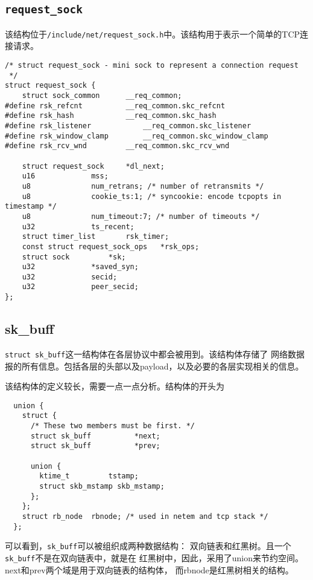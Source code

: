 	\subsection{\texttt{request_sock}}

		该结构位于\texttt{/include/net/request_sock.h}中。该结构用于表示一个简单的TCP连接请求。

\begin{verbatim}
/* struct request_sock - mini sock to represent a connection request
 */
struct request_sock {
	struct sock_common		__req_common;
#define rsk_refcnt			__req_common.skc_refcnt
#define rsk_hash			__req_common.skc_hash
#define rsk_listener			__req_common.skc_listener
#define rsk_window_clamp		__req_common.skc_window_clamp
#define rsk_rcv_wnd			__req_common.skc_rcv_wnd

	struct request_sock		*dl_next;
	u16				mss;
	u8				num_retrans; /* number of retransmits */
	u8				cookie_ts:1; /* syncookie: encode tcpopts in timestamp */
	u8				num_timeout:7; /* number of timeouts */
	u32				ts_recent;
	struct timer_list		rsk_timer;
	const struct request_sock_ops	*rsk_ops;
	struct sock			*sk;
	u32				*saved_syn;
	u32				secid;
	u32				peer_secid;
};
\end{verbatim}

    \subsection{sk\_buff}
\label{sec:sk_buff}

\texttt{struct sk_buff}这一结构体在各层协议中都会被用到。该结构体存储了
网络数据报的所有信息。包括各层的头部以及payload，以及必要的各层实现相关的信息。

该结构体的定义较长，需要一点一点分析。结构体的开头为
\begin{verbatim}
  union {
    struct {
      /* These two members must be first. */
      struct sk_buff          *next;
      struct sk_buff          *prev;

      union {
        ktime_t         tstamp;
        struct skb_mstamp skb_mstamp;
      };
    };
    struct rb_node  rbnode; /* used in netem and tcp stack */
  };
\end{verbatim}

可以看到，\texttt{sk_buff}可以被组织成两种数据结构：
双向链表和红黑树。且一个\texttt{sk_buff}不是在双向链表中，就是在
红黑树中，因此，采用了union来节约空间。next和prev两个域是用于双向链表的结构体，
而rbnode是红黑树相关的结构。

